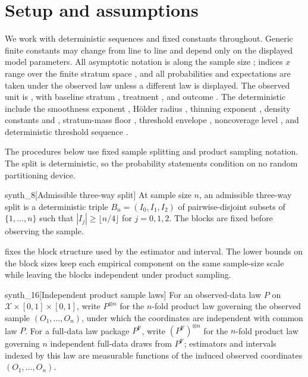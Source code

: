 \section{Setup and assumptions}
\label{sec:setup-assumptions}

We work with deterministic sequences and fixed constants throughout. Generic finite constants may change from line to line and depend only on the displayed model parameters. All asymptotic notation is along the sample size ; indices \(x\) range over the finite stratum space , and all probabilities and expectations are taken under the observed law  unless a different law is displayed. The observed unit is , with baseline stratum , treatment , and outcome . The deterministic  include the smoothness exponent , Hölder radius , thinning exponent , density constants  and , stratum-mass floor , threshold envelope , noncoverage level , and deterministic threshold sequence .

The procedures below use fixed sample splitting and product sampling notation. The split is deterministic, so the probability statements condition on no random partitioning device.

\begin{definitionv}{synth_8}[Admissible three-way split]
At sample size \(n\), an admissible three-way split is a deterministic triple \(B_n=(I_0,I_1,I_2)\) of pairwise-disjoint subsets of \(\{1,\ldots,n\}\) such that \(|I_j|\geq\lfloor n/4\rfloor\) for \(j=0,1,2\). The blocks are fixed before observing the sample.
\end{definitionv}

 fixes the block structure used by the estimator and interval. The lower bounds on the block sizes keep each empirical component on the same sample-size scale while leaving the blocks independent under product sampling.

\begin{definitionv}{synth_16}[Independent product sample laws]
For an observed-data law \(P\) on \(\mathcal X\times[0,1]\times[0,1]\), write \(P^{\otimes n}\) for the \(n\)-fold product law governing the observed sample \((O_1,\ldots,O_n)\), under which the coordinates are independent with common law \(P\). For a full-data law package \(P^{\mathrm F}\), write \((P^{\mathrm F})^{\otimes n}\) for the \(n\)-fold product law governing \(n\) independent full-data draws from \(P^{\mathrm F}\); estimators and intervals indexed by this law are measurable functions of the induced observed coordinates \((O_1,\ldots,O_n)\).
\end{definitionv}

